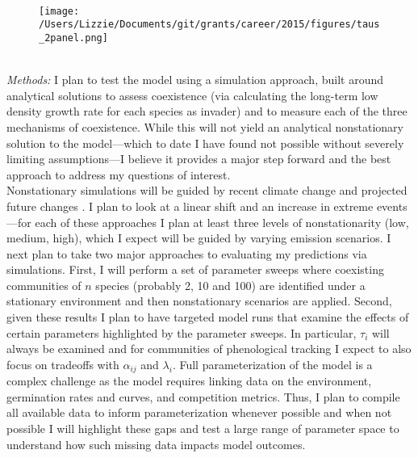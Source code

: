 \documentclass[12pt,a4paper,oneside]{article}
\begin{document}
\vspace{1.5ex}\\
\begin{figure}[h!]
\begin{center}
\texttt{[image: /Users/Lizzie/Documents/git/grants/career/2015/figures/taus\_2panel.png]}
\end{center}
\end{figure}
\vspace{1.5ex}\\
\emph{Methods:} 
I plan to test the model using a simulation approach, built around analytical solutions to assess coexistence (via calculating the long-term low density growth rate for each species as invader) and to measure each of the three mechanisms of coexistence. While this will not yield an analytical nonstationary solution to the model---which to date I have found not possible without severely limiting assumptions---I believe it provides a major step forward and the best approach to address my questions of interest. 
\vspace{1.5ex}\\
Nonstationary simulations will be guided by recent climate change and projected future changes \citep{ipcc2013}. I plan to look at a linear shift and an increase in extreme events---for each of these approaches I plan at least three levels of nonstationarity (low, medium, high), which I expect will be guided by varying emission scenarios. I next plan to take two major approaches to evaluating my predictions via simulations. First, I will perform a set of parameter sweeps where coexisting communities of $n$ species (probably 2, 10 and 100) are identified under a stationary environment and then nonstationary scenarios are applied. Second, given these results I plan to have targeted model runs that examine the effects of certain parameters highlighted by the parameter sweeps. In particular, $\tau_i$ will always be examined and for communities of phenological tracking I expect to also focus on tradeoffs with $\alpha_{ij}$ and $\lambda_i$. Full parameterization of the model is a complex challenge as the model requires linking data on the environment, germination rates and curves, and competition metrics. Thus, I plan to compile all available data to inform parameterization whenever possible and when not possible I will highlight these gaps and test a large range of parameter space to understand how such missing data impacts model outcomes. 
\vspace{1.5ex}\\
\end{document}
